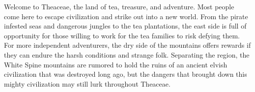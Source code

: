 Welcome to Theaceae, the land of tea, treasure, and adventure.
Most people come here to escape civilization and strike out into a new world.
From the pirate infested seas and dangerous jungles to the tea plantations, the east side is full of opportunity for those willing to work for the tea families to risk defying them.
For more independent adventurers, the dry side of the mountains offers rewards if they can endure the harsh conditions and strange folk.
Separating the region, the White Spine mountains are rumored to hold the ruins of an ancient elvish civilization that was destroyed long ago, but the dangers that brought down this mighty civilization may still lurk throughout Theaceae.
